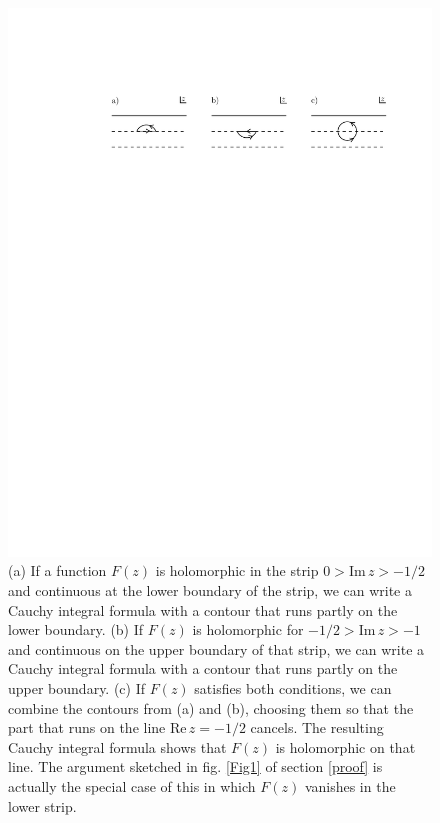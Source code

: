 \documentclass[12pt]{article}
\numberwithin{equation}{section}
\begin{document}
\begin{appendix}
 \begin{figure}
 \begin{center}
   \includegraphics[width=5.5in]{Fig6.pdf}
 \end{center}
\caption{\small (a) If a function $F(z)$ is holomorphic in the strip $0>\mathrm{Im}\,z>-1/2$ and continuous
at the lower boundary of the strip, we can write a Cauchy integral formula with a contour that runs partly on the lower
boundary.  (b) If $F(z)$ is holomorphic for $-1/2>\mathrm{Im}\,z>-1$ and continuous on the upper
boundary of that strip, we can write a Cauchy integral formula with a contour that runs partly on the upper boundary.
(c) If $F(z)$ satisfies both conditions, we can combine the contours  from (a) and (b), choosing
them so that the part that runs on the line $\mathrm{Re}\,z=-1/2$ cancels.  The resulting Cauchy integral
formula shows that $F(z)$ is holomorphic on that line.  The argument sketched in fig. \ref{Fig1} of section \ref{proof}  is actually
the special case of this in which $F(z)$ vanishes in the lower strip.  \label{Fig6}}
\end{figure}
 


\end{appendix}
\end{document}
